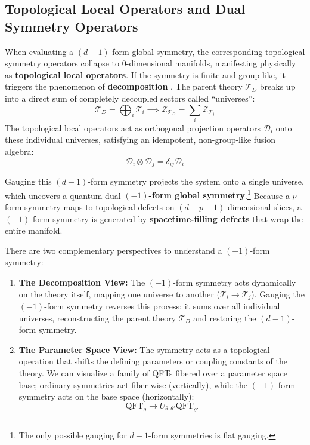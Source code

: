 \documentclass[aps,preprint,nofootinbib,preprintnumbers,eqsecnum,superscriptaddress]{revtex4}
\numberwithin{equation}{section}
\begin{document}
\subsection{Topological Local Operators and Dual Symmetry Operators}
\label{sec:topo_loc_op}

When evaluating a $(d-1)$-form global symmetry, the corresponding topological symmetry operators collapse to $0$-dimensional manifolds, manifesting physically as {\bf topological local operators}. If the symmetry is finite and group-like, it triggers the phenomenon of {\bf decomposition} \cite{McGreevy_2023, vandermeulen2022lowerformsymmetries}. The parent theory $\mathcal{T}_D$ breaks up into a direct sum of completely decoupled sectors called ``universes'':
\begin{equation}
    \mathcal{T}_D = \bigoplus_i \mathcal{T}_i \implies \mathcal{Z}_{\mathcal{T}_D} = \sum_i \mathcal{Z}_{\mathcal{T}_i}
\end{equation}
The topological local operators act as orthogonal projection operators $\mathcal{D}_i$ onto these individual universes, satisfying an idempotent, non-group-like fusion algebra:
\begin{equation}
    \mathcal{D}_i \otimes \mathcal{D}_j = \delta_{ij} \mathcal{D}_i
\end{equation}

Gauging this $(d-1)$-form symmetry projects the system onto a single universe, which uncovers a quantum dual {\bf $(-1)$-form global symmetry}.\footnote{The only possible gauging for $d-1$-form symmetries is flat gauging.} Because a $p$-form symmetry maps to topological defects on $(d-p-1)$-dimensional slices, a $(-1)$-form symmetry is generated by {\bf spacetime-filling defects} that wrap the entire manifold.

There are two complementary perspectives to understand a $(-1)$-form symmetry:
\begin{enumerate}[\itshape i)]
    \item {\bf The Decomposition View:} The $(-1)$-form symmetry acts dynamically on the theory itself, mapping one universe to another ($\mathcal{T}_i \to \mathcal{T}_j$). Gauging the $(-1)$-form symmetry reverses this process: it sums over all individual universes, reconstructing the parent theory $\mathcal{T}_D$ and restoring the $(d-1)$-form symmetry.
    \item {\bf The Parameter Space View:} The symmetry acts as a topological operation that shifts the defining parameters or coupling constants of the theory. We can visualize a family of QFTs fibered over a parameter space base; ordinary symmetries act fiber-wise (vertically), while the $(-1)$-form symmetry acts on the base space (horizontally):
    \begin{equation}
        \text{QFT}_{\theta} \longrightarrow U_{\theta, \theta'} \text{QFT}_{\theta'}
    \end{equation}
\end{enumerate}
\end{document}
